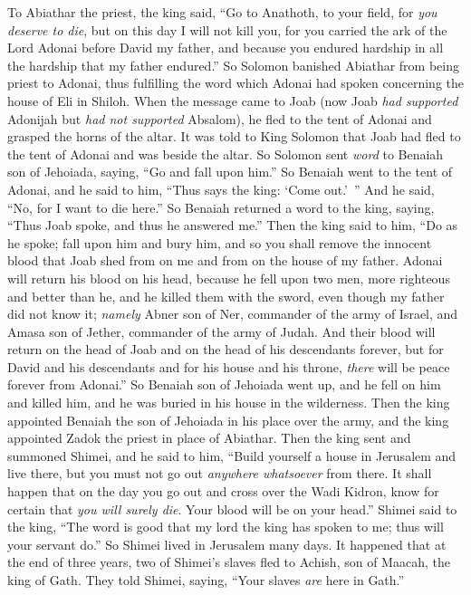 \begin{biblechapter}
\verse To Abiathar the priest, the king said, “Go to Anathoth, to your field, for \textit{you deserve to die}, but on this day I will not kill you, for you carried the ark of the Lord Adonai before David my father, and because you endured hardship in all the hardship that my father endured.”
\verse So Solomon banished Abiathar from being priest to Adonai, thus fulfilling the word which Adonai had spoken concerning the house of Eli in Shiloh.
\verse When the message came to Joab (now Joab \textit{had supported} Adonijah but \textit{had not supported} Absalom), he fled to the tent of Adonai and grasped the horns of the altar.
\verse It was told to King Solomon that Joab had fled to the tent of Adonai and was beside the altar. So Solomon sent \textit{word} to Benaiah son of Jehoiada, saying, “Go and fall upon him.”
\verse So Benaiah went to the tent of Adonai, and he said to him, “Thus says the king: ‘Come out.’ ” And he said, “No, for I want to die here.” So Benaiah returned a word to the king, saying, “Thus Joab spoke, and thus he answered me.”
\verse Then the king said to him, “Do as he spoke; fall upon him and bury him, and so you shall remove the innocent blood that Joab shed from on me and from on the house of my father.
\verse Adonai will return his blood on his head, because he fell upon two men, more righteous and better than he, and he killed them with the sword, even though my father did not know it; \textit{namely} Abner son of Ner, commander of the army of Israel, and Amasa son of Jether, commander of the army of Judah.
\verse And their blood will return on the head of Joab and on the head of his descendants forever, but for David and his descendants and for his house and his throne, \textit{there} will be peace forever from Adonai.”
\verse So Benaiah son of Jehoiada went up, and he fell on him and killed him, and he was buried in his house in the wilderness.
\verse Then the king appointed Benaiah the son of Jehoiada in his place over the army, and the king appointed Zadok the priest in place of Abiathar.
\verse Then the king sent and summoned Shimei, and he said to him, “Build yourself a house in Jerusalem and live there, but you must not go out \textit{anywhere whatsoever} from there.
\verse It shall happen that on the day you go out and cross over the Wadi Kidron, know for certain that \textit{you will surely die}. Your blood will be on your head.”
\verse Shimei said to the king, “The word is good that my lord the king has spoken to me; thus will your servant do.” So Shimei lived in Jerusalem many days.
\verse It happened that at the end of three years, two of Shimei’s slaves fled to Achish, son of Maacah, the king of Gath. They told Shimei, saying, “Your slaves \textit{are} here in Gath.”

\end{biblechapter}
